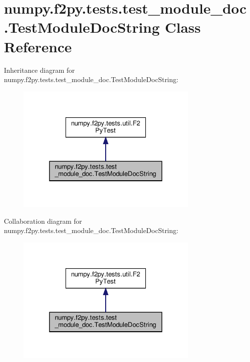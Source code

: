 \hypertarget{classnumpy_1_1f2py_1_1tests_1_1test__module__doc_1_1TestModuleDocString}{}\section{numpy.\+f2py.\+tests.\+test\+\_\+module\+\_\+doc.\+Test\+Module\+Doc\+String Class Reference}
\label{classnumpy_1_1f2py_1_1tests_1_1test__module__doc_1_1TestModuleDocString}


Inheritance diagram for numpy.\+f2py.\+tests.\+test\+\_\+module\+\_\+doc.\+Test\+Module\+Doc\+String\+:
\nopagebreak
\begin{figure}[H]
\begin{center}
\leavevmode
\includegraphics[width=252pt]{classnumpy_1_1f2py_1_1tests_1_1test__module__doc_1_1TestModuleDocString__inherit__graph}
\end{center}
\end{figure}


Collaboration diagram for numpy.\+f2py.\+tests.\+test\+\_\+module\+\_\+doc.\+Test\+Module\+Doc\+String\+:
\nopagebreak
\begin{figure}[H]
\begin{center}
\leavevmode
\includegraphics[width=252pt]{classnumpy_1_1f2py_1_1tests_1_1test__module__doc_1_1TestModuleDocString__coll__graph}
\end{center}
\end{figure}
